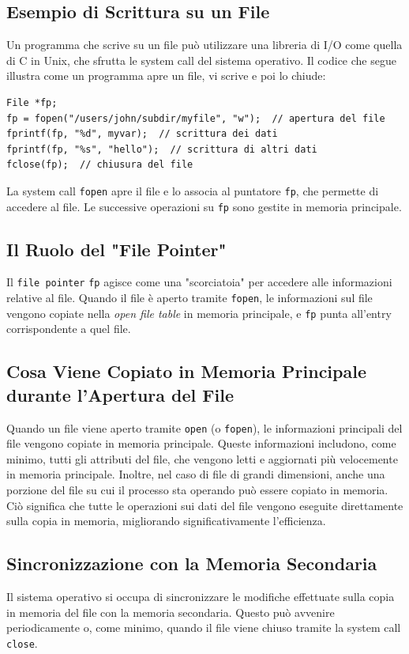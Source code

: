 \subsection{Esempio di Scrittura su un File}
Un programma che scrive su un file può utilizzare una libreria di I/O come quella di C in Unix, che sfrutta le system call del sistema operativo. Il codice che segue illustra come un programma apre un file, vi scrive e poi lo chiude:

\begin{verbatim}
File *fp;
fp = fopen("/users/john/subdir/myfile", "w");  // apertura del file
fprintf(fp, "%d", myvar);  // scrittura dei dati
fprintf(fp, "%s", "hello");  // scrittura di altri dati
fclose(fp);  // chiusura del file
\end{verbatim}
La system call \texttt{fopen} apre il file e lo associa al puntatore \texttt{fp}, che permette di accedere al file. Le successive operazioni su \texttt{fp} sono gestite in memoria principale.

\subsection{Il Ruolo del "File Pointer"}
Il \texttt{file pointer} \texttt{fp} agisce come una "scorciatoia" per accedere alle informazioni relative al file. Quando il file è aperto tramite \texttt{fopen}, le informazioni sul file vengono copiate nella \textit{open file table} in memoria principale, e \texttt{fp} punta all'entry corrispondente a quel file.


\subsection{Cosa Viene Copiato in Memoria Principale durante l'Apertura del File}
Quando un file viene aperto tramite \texttt{open} (o \texttt{fopen}), le informazioni principali del file vengono copiate in memoria principale. Queste informazioni includono, come minimo, tutti gli attributi del file, che vengono letti e aggiornati più velocemente in memoria principale. Inoltre, nel caso di file di grandi dimensioni, anche una porzione del file su cui il processo sta operando può essere copiato in memoria.
Ciò significa che tutte le operazioni sui dati del file vengono eseguite direttamente sulla copia in memoria, migliorando significativamente l'efficienza.

\subsection{Sincronizzazione con la Memoria Secondaria}
Il sistema operativo si occupa di sincronizzare le modifiche effettuate sulla copia in memoria del file con la memoria secondaria. Questo può avvenire periodicamente o, come minimo, quando il file viene chiuso tramite la system call \texttt{close}.

